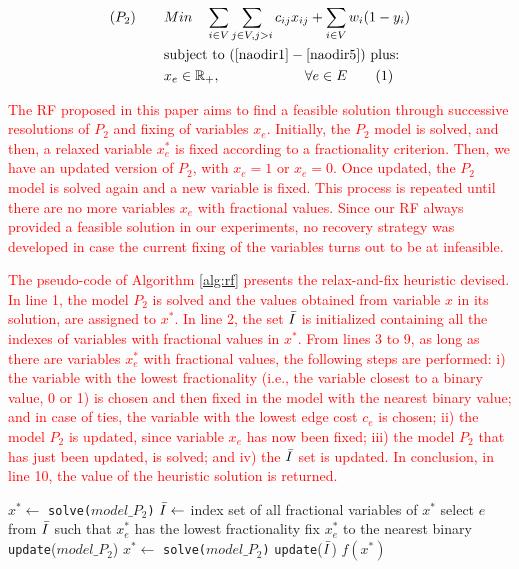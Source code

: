 \documentclass{ro}
\newcommand\numberthis{\addtocounter{equation}{1}\tag{\theequation}}
\begin{document}
\textcolor{red}{\begin{align*}
(P_2) \qquad	&Min \quad  \sum_{i \in V} \sum_{j \in V, j > i} c_{ij}x_{ij} + \sum_{i \in V} w_i (1 - y_i)  \\
&\text{subject to } (\ref{naodir1} - \ref{naodir5}) \text{ plus:}\\
	&x_e \in \mathbb{R_+}, \qquad \qquad \qquad \forall e \in E \label{xe-rl} \numberthis
\end{align*}
}

\textcolor{red}{
The RF proposed in this paper aims to find a feasible solution through successive resolutions of $P_2$ and fixing of variables $x_e$. Initially, the $P_2$ model is solved, and then, a relaxed variable $x_e^*$ is fixed according to a fractionality criterion. Then, we have an updated version of $P_2$, with $x_e=1$ or $x_e=0$. Once updated, the $P_2$ model is solved again  and a new variable is fixed. This process is repeated until there are no more variables $x_e$ with fractional values. Since our RF always provided a feasible solution in our experiments, no recovery strategy was developed in case the current fixing of the variables turns out to be at infeasible.}


\textcolor{red}{
The pseudo-code of Algorithm \ref{alg:rf} presents the relax-and-fix heuristic devised. In line 1, the model $P_2$ is solved and the values obtained from variable $x$ in its solution, are assigned to $x^*$. In line 2, the set $\Bar{I}$ is initialized containing all the indexes of variables with fractional values in $x^*$. From lines 3 to 9, as long as there are variables $x_e^*$ with fractional values, the following steps are performed: i) the variable with the lowest fractionality (i.e., the variable closest to a binary value, 0 or 1) is chosen and then fixed in the model with the nearest binary value; \textcolor{red}{and in case of ties, the variable with the lowest edge cost $c_e$ is chosen}; ii) the model $P_2$ is updated, since variable $x_e$ has now been fixed; iii) the model $P_2$ that has just been updated, is solved; and iv) the $\Bar{I}$ set is updated. In conclusion, in line 10, the value of the heuristic solution is returned.
}

\begin{algorithm}[!h]
	\caption{\hspace{-1mm}\textbf{: RF }($model\_P_2$)}
	\label{alg:rf}
	{\footnotesize
		\begin{algorithmic}[1]	
			\STATE $x^*\gets$ \texttt{solve($model\_P_2$)} 
			\STATE $\Bar{I} \gets$ index set of all fractional variables of $x^*$
			\STATE select $e$ from $\Bar{I}$ such that $x^*_e$ has the lowest fractionality 
			\STATE fix $x^*_e$ to the nearest binary
			\STATE \texttt{update}($model\_P_2$)
			\STATE $ x^*\gets$ \texttt{solve($model\_P_2$)} 
			\STATE \texttt{update}($\Bar{I}$)
			\ENDWHILE
			\RETURN $f(x^*)$
		\end{algorithmic}
	}
\end{algorithm}
\end{document}
